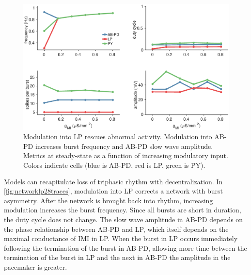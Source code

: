 \begin{figure}[h]
	\centering
	\includegraphics[width=1.0\linewidth]{gfx/network/network_LP_28_metrics}
	\caption[Network with modulation into LP (metrics)]{Modulation into \acs{LP} rescues abnormal activity. Modulation into \acs{AB}-\acs{PD} increases burst frequency and \acs{AB}-\acs{PD} slow wave amplitude. Metrics at steady-state as a function of increasing modulatory input. Colors indicate cells (blue is \acs{AB}-\acs{PD}, red is \acs{LP}, green is \acs{PY}).}
	\label{fig:networklp28metrics}
\end{figure}

\FloatBarrier

Models can recapitulate loss of triphasic rhythm with decentralization. In \autoref{fig:networklp28traces}, modulation into \acs{LP} corrects a network with burst asymmetry. After the network is brought back into rhythm, increasing modulation increases the burst frequency. Since all bursts are short in duration, the duty cycle does not change. The slow wave amplitude in \acs{AB}-\acs{PD} depends on the phase relationship between \acs{AB}-\acs{PD} and \acs{LP}, which itself depends on the maximal conductance of \acs{IMI} in \acs{LP}. When the burst in \acs{LP} occurs immediately following the termination of the burst in \acs{AB}-\acs{PD}, allowing more time between the termination of the burst in \acs{LP} and the next in \acs{AB}-\acs{PD} the amplitude in the pacemaker is greater.

